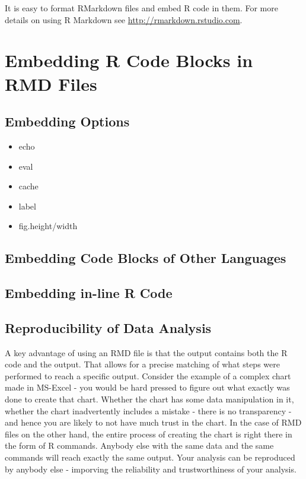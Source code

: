 \documentclass[
]{krantz}
\providecommand{\tightlist}{%
  \setlength{\itemsep}{0pt}\setlength{\parskip}{0pt}}
\begin{document}
It is easy to format RMarkdown files and embed R code in them. For more details on using R Markdown see \url{http://rmarkdown.rstudio.com}.

\hypertarget{embedding-r-code-blocks-in-rmd-files}{%
\section{Embedding R Code Blocks in RMD Files}\label{embedding-r-code-blocks-in-rmd-files}}

\hypertarget{embedding-options}{%
\subsection{Embedding Options}\label{embedding-options}}

\begin{itemize}
\tightlist
\item
  echo
\item
  eval
\item
  cache
\item
  label
\item
  fig.height/width
\end{itemize}

\hypertarget{embedding-code-blocks-of-other-languages}{%
\subsection{Embedding Code Blocks of Other Languages}\label{embedding-code-blocks-of-other-languages}}

\hypertarget{embedding-in-line-r-code}{%
\subsection{Embedding in-line R Code}\label{embedding-in-line-r-code}}

\hypertarget{reproducibility-of-data-analysis}{%
\subsection{Reproducibility of Data Analysis}\label{reproducibility-of-data-analysis}}

A key advantage of using an RMD file is that the output contains both the R code and the output. That allows for a precise matching of what steps were performed to reach a specific output. Consider the example of a complex chart made in MS-Excel - you would be hard pressed to figure out what exactly was done to create that chart. Whether the chart has some data manipulation in it, whether the chart inadvertently includes a mistake - there is no transparency - and hence you are likely to not have much trust in the chart. In the case of RMD files on the other hand, the entire process of creating the chart is right there in the form of R commands. Anybody else with the same data and the same commands will reach exactly the same output. Your analysis can be reproduced by anybody else - imporving the reliability and trustworthiness of your analysis.
\end{document}
